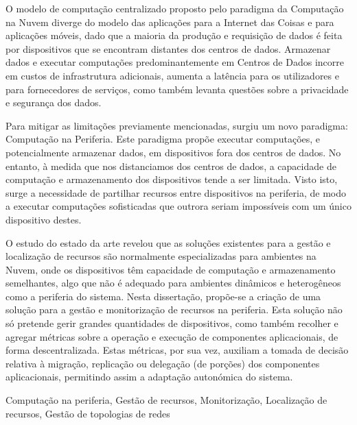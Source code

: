 
O modelo de computação centralizado proposto pelo paradigma da Computação na Nuvem diverge do modelo das aplicações para a Internet das Coisas e para aplicações móveis, dado que a maioria da produção e requisição de dados é feita por dispositivos que se encontram distantes dos centros de dados. Armazenar dados e executar computações predominantemente em Centros de Dados incorre em custos de infrastrutura adicionais, aumenta a latência para os utilizadores e para fornecedores de serviços, como também levanta questões sobre a privacidade e segurança dos dados.

Para mitigar as limitações previamente mencionadas, surgiu um novo paradigma: Computação na Periferia. Este paradigma propõe executar computações, e potencialmente armazenar dados, em dispositivos fora dos centros de dados. No entanto, à medida que nos distanciamos dos centros de dados, a capacidade de computação e armazenamento dos dispositivos tende a ser limitada. Visto isto, surge a necessidade de partilhar recursos entre dispositivos na periferia, de modo a executar computações sofisticadas que outrora seriam impossíveis com um único dispositivo destes.

O estudo do estado da arte revelou que as soluções existentes para a gestão e localização de recursos são normalmente especializadas para ambientes na Nuvem, onde os dispositivos têm capacidade de computação e armazenamento semelhantes, algo que não é adequado para ambientes dinâmicos e heterogêneos como a periferia do sistema. 
Nesta dissertação, propõe-se a criação de uma solução para a gestão e monitorização de recursos na periferia. Esta solução não só pretende gerir grandes quantidades de dispositivos, como também recolher e agregar métricas sobre a operação e execução de componentes aplicacionais, de forma descentralizada.
Estas métricas, por sua vez, auxiliam a tomada de decisão relativa à migração, replicação ou delegação (de porções) dos componentes aplicacionais, permitindo assim a adaptação autonómica do sistema.


\begin{keywords}

    
    Computação na periferia, Gestão de recursos, Monitorização, Localização de recursos, Gestão de topologias de redes

\end{keywords}
